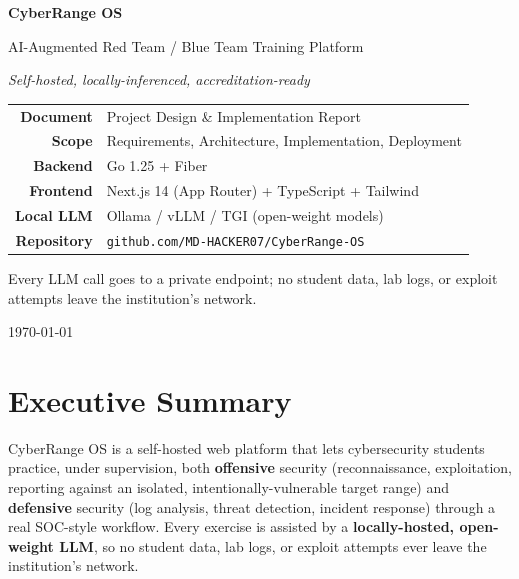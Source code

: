 \documentclass[11pt,a4paper]{article}
\begin{document}
\begin{titlepage}
\centering
\vspace*{1.2cm}
{\Huge\bfseries\color{vreddeep} CyberRange OS\par}
\vspace{0.4cm}
{\Large AI-Augmented Red Team / Blue Team Training Platform\par}
\vspace{0.2cm}
{\large\itshape Self-hosted, locally-inferenced, accreditation-ready\par}
\vspace{1.4cm}


\vspace{1.6cm}
\begin{tabular}{rl}
\textbf{Document} & Project Design \& Implementation Report\\
\textbf{Scope} & Requirements, Architecture, Implementation, Deployment\\
\textbf{Backend} & Go 1.25 + Fiber\\
\textbf{Frontend} & Next.js 14 (App Router) + TypeScript + Tailwind\\
\textbf{Local LLM} & Ollama / vLLM / TGI (open-weight models)\\
\textbf{Repository} & \texttt{github.com/MD-HACKER07/CyberRange-OS}\\
\end{tabular}

\vfill
{\small Every LLM call goes to a private endpoint; no student data, lab logs, or
exploit attempts leave the institution's network.\par}
\vspace{0.6cm}
{\small \today\par}
\end{titlepage}

\tableofcontents
\newpage

\section{Executive Summary}
CyberRange OS is a self-hosted web platform that lets cybersecurity students
practice, under supervision, both \textbf{offensive} security (reconnaissance,
exploitation, reporting against an isolated, intentionally-vulnerable target
range) and \textbf{defensive} security (log analysis, threat detection, incident
response) through a real SOC-style workflow. Every exercise is assisted by a
\textbf{locally-hosted, open-weight LLM}, so no student data, lab logs, or
exploit attempts ever leave the institution's network.
\end{document}
